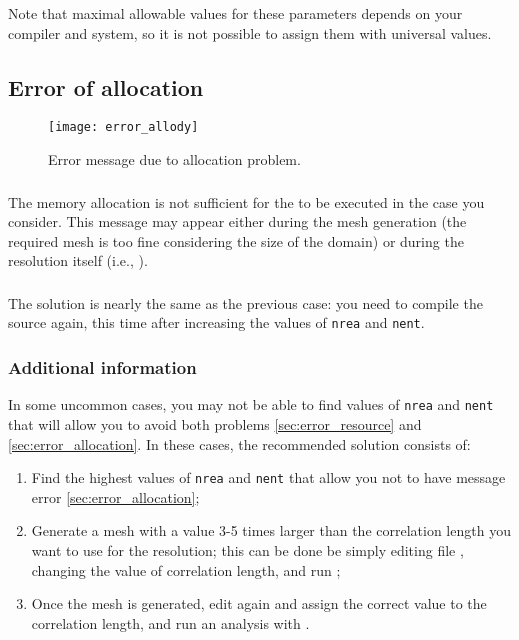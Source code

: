 Note that maximal allowable values for these parameters depends on your compiler and system, so it is not possible to assign them with universal values.

\subsection{Error of allocation \label{sec:error_allocation}}

\begin{figure}[htpb]
\centering
\texttt{[image: error\_allody]}
\caption{Error message due to allocation problem.\label{fig:error_allocation}}
\end{figure}

\subsubsection{\question}

The memory allocation is not sufficient for the \diva to be executed in the case you consider. This message may appear either during the mesh generation (the required mesh is too fine considering the size of the domain) or during the resolution itself (i.e., ).

\subsubsection{\answer}

The solution is nearly the same as the previous case: you need to compile the source again, this time after increasing the values of \texttt{nrea} and \texttt{nent}.

\subsubsection[Additional information]{Additional information \expert}

In some uncommon cases, you may not be able to find values of \texttt{nrea} and \texttt{nent} that will allow you to avoid both problems \ref{sec:error_resource} and \ref{sec:error_allocation}. In these cases, the recommended solution consists of:
\begin{enumerate}
\item Find the highest values of \texttt{nrea} and \texttt{nent} that allow you not to have message error \ref{sec:error_allocation};
\item Generate a mesh with a value 3-5 times larger than the correlation length you want to use for the resolution; this can be done be simply editing file , changing the value of correlation length, and run ;
\item Once the mesh is generated, edit again  and assign the correct value to the correlation length, and run an analysis with .
\end{enumerate}

